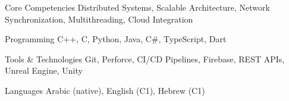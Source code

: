 
\begin{cvskills}

  \cvskill
    {Core Competencies}
    {Distributed Systems, Scalable Architecture, Network Synchronization, Multithreading, Cloud Integration}

  \cvskill
    {Programming}
    {C++, C, Python, Java, C\#, TypeScript, Dart}

  \cvskill
    {Tools \& Technologies}
    {Git, Perforce, CI/CD Pipelines, Firebase, REST APIs, Unreal Engine, Unity}

  \cvskill
    {Languages}
    {Arabic (native), English (C1), Hebrew (C1)}

\end{cvskills}
